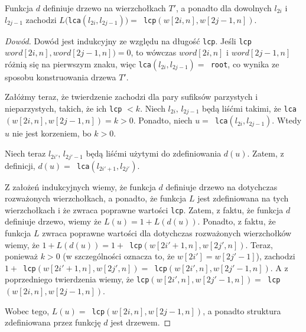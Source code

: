 \begin{theorem}{}{}
Funkcja $d$ definiuje drzewo na wierzchołkach $T'$, a ponadto dla dowolnych $l_{2i}$ i $l_{2j-1}$ zachodzi $L($\verb|lca|$(l_{2i}, l_{2j-1})) = $\verb| lcp|$(w[2i,n], w[2j-1,n])$.
\end{theorem}
\begin{proof}[Dowód]
Dowód jest indukcyjny ze względu na długość \verb|lcp|. Jeśli \verb|lcp|$word[2i, n], word[2j-1,n]) = 0$, to wówczas $word[2i, n]$ i $word[2j-1,n]$ różnią się na pierwszym znaku, więc \verb|lca|$(l_{2i}, l_{2j-1}) = $\verb| root|, co wynika ze sposobu konstruowania drzewa $T'$.

Załóżmy teraz, że twierdzenie zachodzi dla pary sufiksów parzystych i nieparzystych, takich, że ich \verb|lcp| $< k$. Niech $l_{2i},\,l_{2j-1}$ będą liśćmi takimi, że \verb|lca|$(w[2i,n], w[2j-1,n]) = k > 0$. Ponadto, niech $u = $\verb| lca|$(l_{2i}, l_{2j-1})$. Wtedy $u$ nie jest korzeniem, bo $k > 0$.

Niech teraz $l_{2i'}$, $l_{2j'-1}$ będą liśćmi użytymi do zdefiniowania $d(u)$. Zatem, z definicji, $d(u) = $\verb| lca|$(l_{2i'+1},l_{2j'})$.

Z założeń indukcyjnych wiemy, że funkcja $d$ definiuje drzewo na dotychczas rozważonych wierzchołkach, a ponadto, że funkcja $L$ jest zdefiniowana na tych wierzchołkach i że zwraca poprawne wartości \verb|lcp|. Zatem, z faktu, że funkcja $d$ definiuje drzewo, wiemy że $L(u) = 1 + L(d(u))$. Ponadto, z faktu, że funkcja $L$ zwraca poprawne wartości dla dotychczas rozważonych wierzchołków wiemy, że $1 + L(d(u)) = 1 + $\verb| lcp|$(w[2i'+1,n],w[2j',n])$. Teraz, ponieważ $k > 0$ (w szczególności oznacza to, że $w[2i'] = w[2j'-1]$), zachodzi $1 + $\verb| lcp|$(w[2i'+1,n],w[2j',n]) = $\verb| lcp|$(w[2i',n],w[2j'-1,n])$. A z poprzedniego twierdzenia wiemy, że \verb|lcp|$(w[2i',n],w[2j'-1,n]) = $\verb| lcp|$(w[2i,n],w[2j-1,n])$.

Wobec tego, $L(u) = $\verb| lcp|$(w[2i,n],w[2j-1,n])$, a ponadto struktura zdefiniowana przez funkcję $d$ jest drzewem.
\end{proof}

